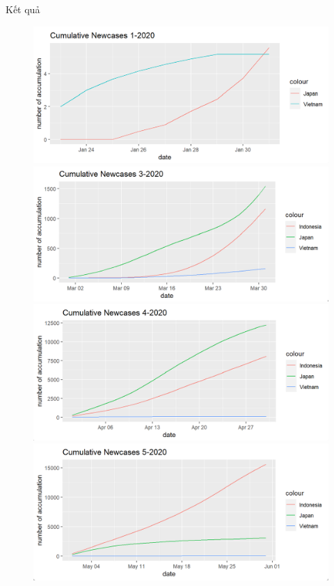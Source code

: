 \documentclass[a4paper]{article}
\theoremstyle{definition}
\begin{document}
\begin{enumerate}[1)]
	Kết quả
	\begin{figure}[H]
	    \begin{center}
            \includegraphics[scale=0.5]{vi/cml_nc_1_2020}
    		\includegraphics[scale=0.5]{vi/cml_nc_3_2020}
    		\includegraphics[scale=0.5]{vi/cml_nc_4_2020}
    		\includegraphics[scale=0.5]{vi/cml_nc_5_2020}

\end{center}
\end{figure}
\end{enumerate}
\end{document}
